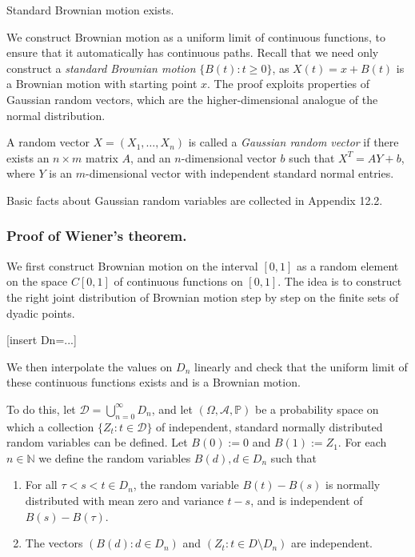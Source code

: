 \documentclass{article}
\begin{document}
\begin{theorem}[Wiener 1923] \label{thm:BMexists}
Standard Brownian motion exists.
\end{theorem}

We construct Brownian motion as a uniform limit of continuous functions, to ensure that it automatically has continuous paths. Recall that we need only construct a \emph{standard Brownian motion} $\{ B(t) : t \geq 0 \}$, as $X(t) = x + B(t)$ is a Brownian motion with starting point $x$. The proof exploits properties of Gaussian random vectors, which are the higher-dimensional analogue of the normal distribution.

\begin{definition}
A random vector $X = (X_1, \dots, X_n)$ is called a \emph{Gaussian random vector} if there exists an $n \times m$ matrix $A$, and an $n$-dimensional vector $b$ such that $X^T = AY + b$, where $Y$ is an $m$-dimensional vector with independent standard normal entries.
\end{definition}

Basic facts about Gaussian random variables are collected in Appendix 12.2.

\subsubsection*{Proof of Wiener’s theorem.}
We first construct Brownian motion on the interval $[0, 1]$ as a random element on the space $C[0, 1]$ of continuous functions on $[0, 1]$. The idea is to construct the right joint distribution of Brownian motion step by step on the finite sets of dyadic points. 

[insert Dn=...]

We then interpolate the values on $D_n$ linearly and check that the uniform limit of these continuous functions exists and is a Brownian motion.

To do this, let $\mathcal{D} = \bigcup_{n=0}^\infty D_n$, and let $(\Omega, \mathcal{A}, \mathbb{P})$ be a probability space on which a collection $\{ Z_t : t \in \mathcal{D} \}$ of independent, standard normally distributed random variables can be defined. Let $B(0) := 0$ and $B(1) := Z_1$. For each $n \in \mathbb{N}$ we define the random variables $B(d), d \in D_n$ such that
\begin{enumerate}
    \item For all $\tau < s < t \in D_n$, the random variable $B(t) - B(s)$ is normally distributed with mean zero and variance $t - s$, and is independent of $B(s) - B(\tau)$.
    \item The vectors $\left( B(d) : d \in D_n \right)$ and $\left( Z_t : t \in D \setminus D_n \right)$ are independent.
\end{enumerate}
\end{document}

